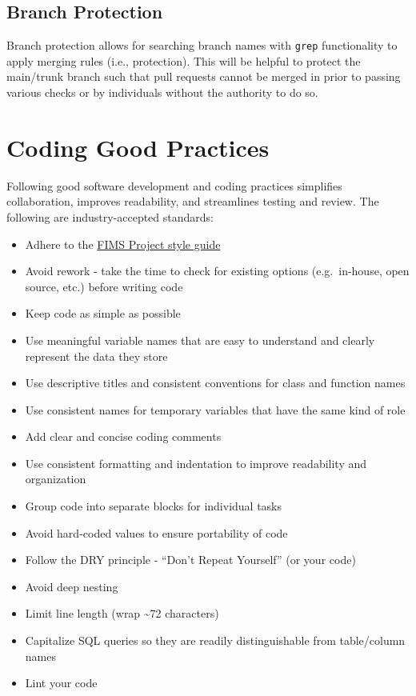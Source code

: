\documentclass[
]{book}
\providecommand{\tightlist}{%
  \setlength{\itemsep}{0pt}\setlength{\parskip}{0pt}}
\begin{document}
\hypertarget{branch-protection}{%
\subsection{Branch Protection}\label{branch-protection}}

Branch protection allows for searching branch names with \texttt{grep} functionality to apply merging rules (i.e., protection). This will be helpful to protect the main/trunk branch such that pull requests cannot be merged in prior to passing various checks or by individuals without the authority to do so.

\hypertarget{coding-good-practices}{%
\section{Coding Good Practices}\label{coding-good-practices}}

Following good software development and coding practices simplifies collaboration, improves readability, and streamlines testing and review. The following are industry-accepted standards:

\begin{itemize}
\tightlist
\item
  Adhere to the \href{https://noaa-fims.github.io/collaborative_workflow/style-guide.html}{FIMS Project style guide}
\item
  Avoid rework - take the time to check for existing options (e.g.~in-house, open source, etc.) before writing code
\item
  Keep code as simple as possible
\item
  Use meaningful variable names that are easy to understand and clearly represent the data they store
\item
  Use descriptive titles and consistent conventions for class and function names
\item
  Use consistent names for temporary variables that have the same kind of role
\item
  Add clear and concise coding comments
\item
  Use consistent formatting and indentation to improve readability and organization
\item
  Group code into separate blocks for individual tasks
\item
  Avoid hard-coded values to ensure portability of code
\item
  Follow the DRY principle - ``Don't Repeat Yourself'' (or your code)
\item
  Avoid deep nesting
\item
  Limit line length (wrap \textasciitilde72 characters)
\item
  Capitalize SQL queries so they are readily distinguishable from table/column names
\item
  Lint your code
\end{itemize}
\end{document}
